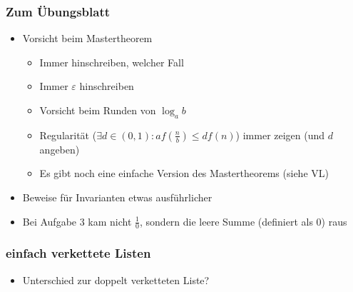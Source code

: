 

\begin{frame}
  \titlepage
\end{frame}

\begin{frame}
\frametitle{Zum Übungsblatt}
\begin{itemize}
\item Vorsicht beim Mastertheorem
\begin{itemize}
\item Immer hinschreiben, welcher Fall
\item Immer $\varepsilon$ hinschreiben
\item Vorsicht beim Runden von $\log_a b$
\item Regularität ($\exists d\in (0,1):a f(\frac{n}{b})\leq d f(n)$) immer zeigen (und $d$ angeben)
\item Es gibt noch eine einfache Version des Mastertheorems (siehe VL)
\end{itemize}\pause
\item Beweise für Invarianten etwas ausführlicher \pause
\item Bei Aufgabe 3 kam nicht $\frac{1}{0}$, sondern die leere Summe (definiert als 0) raus
\end{itemize}
\end{frame}

\begin{frame}
\frametitle{einfach verkettete Listen}
\begin{itemize}
\item Unterschied zur doppelt verketteten Liste?
\end{itemize}
\end{frame}

